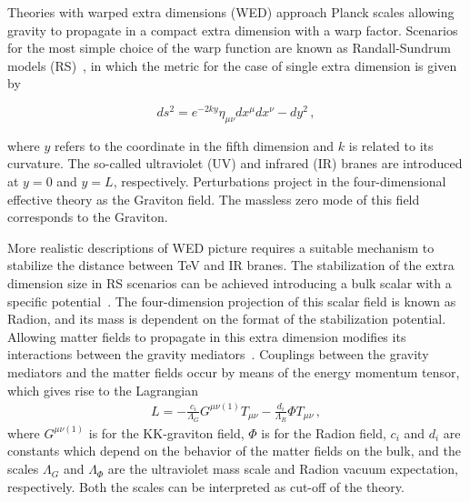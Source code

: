 Theories with warped extra dimensions (WED) approach Planck scales allowing gravity 
to propagate in a compact extra dimension with a warp factor.
Scenarios for the most simple choice of the warp function are known as Randall-Sundrum models
(RS)~\cite{Randall:1999ee}, in which the metric for the case of single extra dimension is given by

\begin{equation}
ds^2 =  e^{- 2 k y}  \eta_{\mu\nu} dx^\mu dx^\nu - dy^2 \,,
\label{expky}
\end{equation}

where $y$ refers to the coordinate in the fifth dimension and $k$ is related to its curvature.
The so-called ultraviolet (UV) and infrared (IR) branes are introduced at $y=0$ and $y=L$,
respectively.
Perturbations project in the four-dimensional effective theory
as the Graviton field. The massless zero mode of this field corresponds to the Graviton.

More realistic descriptions of WED picture requires a suitable mechanism to stabilize the
distance between TeV and IR branes.
The stabilization of the extra dimension size in RS scenarios can be achieved introducing a bulk scalar
with a specific potential~\cite{Goldberger:1999uk}.
The four-dimension projection of this scalar field is known as Radion, 
and its mass is dependent on the format of the stabilization potential. %
Allowing matter fields to propagate in this extra dimension modifies its interactions between the gravity mediators~\cite{Gherghetta:2010cj}. 
Couplings between the gravity mediators and the matter fields occur by means of the
energy momentum tensor, which gives rise to the Lagrangian~\cite{Giudice:1998ck,Csaki:2000zn}
\begin{eqnarray}
L = - \frac{c_i}{\Lambda_G}  G^{\mu\nu(1)} T_{\mu\nu}
- \frac{d_i}{\Lambda_{R}}  \Phi T_{\mu\nu} \,,
\end{eqnarray}
where $G^{\mu\nu(1)}$ is for the KK-graviton field, $\Phi$ is for the Radion field,
$c_i$ and $d_i$ are constants which depend on the behavior of the matter fields on the bulk, and
the scales $\Lambda_G$ and $\Lambda_\Phi$ are the ultraviolet mass scale and Radion vacuum expectation,
respectively. Both the scales can be interpreted as cut-off of the theory.

